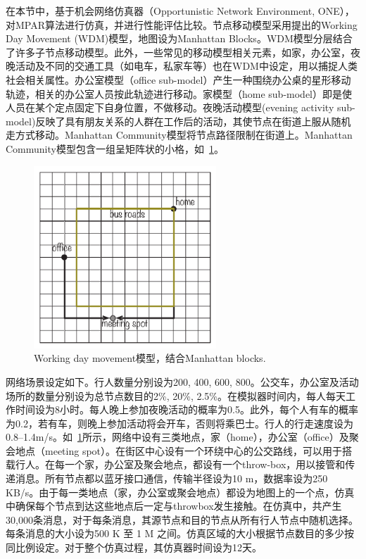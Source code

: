 在本节中，基于机会网络仿真器（Opportunistic Network Environment, ONE），对MPAR算法进行仿真，并进行性能评估比较。节点移动模型采用提出的Working Day Movement (WDM)模型，地图设为Manhattan Blocks。WDM模型分层结合了许多子节点移动模型。此外，一些常见的移动模型相关元素，如家，办公室，夜晚活动及不同的交通工具（如电车，私家车等）也在WDM中设定，用以捕捉人类社会相关属性。办公室模型（office sub-model）产生一种围绕办公桌的星形移动轨迹，相关的办公室人员按此轨迹进行移动。家模型（home sub-model）即是使人员在某个定点固定下自身位置，不做移动。夜晚活动模型(evening activity sub-model)反映了具有朋友关系的人群在工作后的活动，其使节点在街道上服从随机走方式移动。Manhattan Community模型将节点路径限制在街道上。Manhattan Community模型包含一组呈矩阵状的小格，如\figurename~\ref{fig:chap3_manhattan}。

\begin{figure}[!t]
\centering
\includegraphics[width=2.7in]{paper-MPAR/Manhattan}
\caption{Working day movement模型，结合Manhattan blocks.}
\label{fig:chap3_manhattan}
\end{figure}

网络场景设定如下。行人数量分别设为200, 400, 600, 800。公交车，办公室及活动场所的数量分别设为总节点数目的2\%, 20\%, 2.5\%。在模拟器时间内，每人每天工作时间设为8小时。每人晚上参加夜晚活动的概率为0.5。此外，每个人有车的概率为0.2，若有车，则晚上参加活动将会开车，否则将乘巴士。行人的行走速度设为0.8--1.4m/s。如\figurename~\ref{fig:chap3_manhattan}所示，网络中设有三类地点，家（home），办公室（office）及聚会地点（meeting spot）。在街区中心设有一个环绕中心的公交路线，可以用于搭载行人。在每一个家，办公室及聚会地点，都设有一个throw-box，用以接管和传递消息。所有节点都以蓝牙接口通信，传输半径设为10 m，数据率设为250 KB/s。由于每一类地点（家，办公室或聚会地点）都设为地图上的一个点，仿真中确保每个节点到达这些地点后一定与throwbox发生接触。在仿真中，共产生30,000条消息，对于每条消息，其源节点和目的节点从所有行人节点中随机选择。每条消息的大小设为500 K 至 1 M 之间。仿真区域的大小根据节点数目的多少按同比例设定。对于整个仿真过程，其仿真器时间设为12天。

